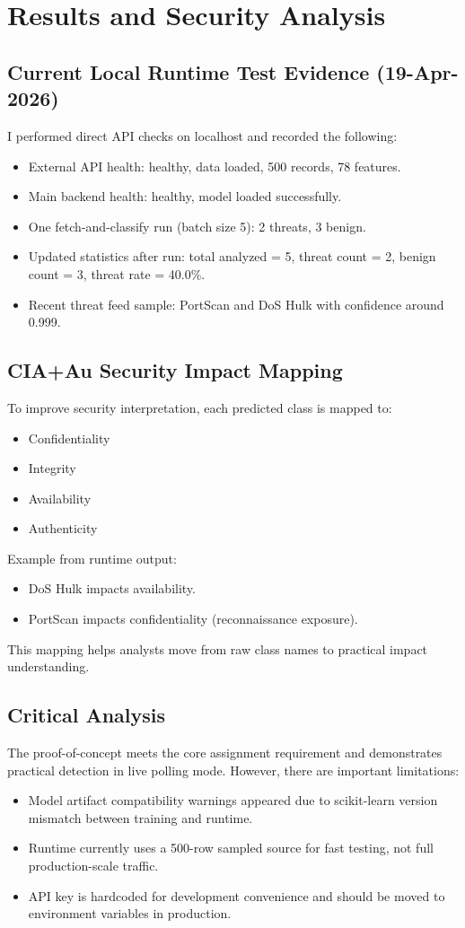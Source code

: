 \documentclass[12pt,a4paper]{article}
\begin{document}
\section{Results and Security Analysis}
\subsection{Current Local Runtime Test Evidence (19-Apr-2026)}
I performed direct API checks on localhost and recorded the following:
\begin{itemize}
\item External API health: healthy, data loaded, 500 records, 78 features.
\item Main backend health: healthy, model loaded successfully.
\item One fetch-and-classify run (batch size 5): 2 threats, 3 benign.
\item Updated statistics after run: total analyzed = 5, threat count = 2, benign count = 3, threat rate = 40.0\%.
\item Recent threat feed sample: PortScan and DoS Hulk with confidence around 0.999.
\end{itemize}

\subsection{CIA+Au Security Impact Mapping}
To improve security interpretation, each predicted class is mapped to:
\begin{itemize}
\item Confidentiality
\item Integrity
\item Availability
\item Authenticity
\end{itemize}

Example from runtime output:
\begin{itemize}
\item DoS Hulk impacts availability.
\item PortScan impacts confidentiality (reconnaissance exposure).
\end{itemize}

This mapping helps analysts move from raw class names to practical impact understanding.

\subsection{Critical Analysis}
The proof-of-concept meets the core assignment requirement and demonstrates practical detection in live polling mode. However, there are important limitations:
\begin{itemize}
\item Model artifact compatibility warnings appeared due to scikit-learn version mismatch between training and runtime.
\item Runtime currently uses a 500-row sampled source for fast testing, not full production-scale traffic.
\item API key is hardcoded for development convenience and should be moved to environment variables in production.
\end{itemize}
\end{document}
